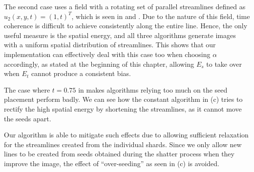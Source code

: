 The second case uses a field with a rotating set of parallel streamlines defined as $u_2(x,y,t)=(1,t)^T$, which is seen in  and .
Due to the nature of this field, time coherence is difficult to achieve consistently along the entire line.
Hence, the only useful measure is the spatial energy, and all three algorithms generate images with a uniform spatial distribution of streamlines.
This shows that our implementation can effectively deal with this case too when choosing $\alpha$ accordingly,
as stated at the beginning of this chapter, allowing $E_s$ to take over when $E_t$ cannot produce a consistent bias.

The case where $t=0.75$ in  makes algorithms relying too much on the seed placement perform badly.
We can see how the constant algorithm in (c) tries to rectify the high spatial
energy by shortening the streamlines, as it cannot move the seeds apart.

Our algorithm is able to mitigate such effects due to allowing sufficient relaxation for the streamlines created from the individual shards.
Since we only allow new lines to be created from seeds obtained during the shatter process when they improve the image,
the effect of ``over-seeding'' as seen in (c) is avoided.

\newpage

